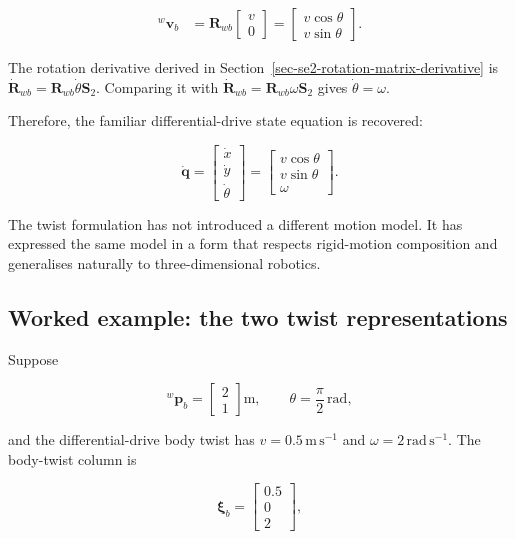 \documentclass[
  australian,
  12pt,
  letterpaper,
  DIV=11,
  numbers=noendperiod,
  twoside]{scrreprt}
\begin{document}
\[
\begin{aligned}
{}^w\mathbf v_b
&=
\mathbf R_{wb}
\begin{bmatrix}
v\\0
\end{bmatrix}
=
\begin{bmatrix}
v\cos\theta\\
v\sin\theta
\end{bmatrix}.
\end{aligned}
\]

The rotation derivative derived in
Section~\ref{sec-se2-rotation-matrix-derivative} is
\(\dot{\mathbf R}_{wb}=\mathbf R_{wb}\dot\theta\mathbf S_2\). Comparing
it with \(\dot{\mathbf R}_{wb}=\mathbf R_{wb}\omega\mathbf S_2\) gives
\(\dot\theta=\omega\).

Therefore, the familiar differential-drive state equation is recovered:

\[
\boxed{
\dot{\mathbf q}
=
\begin{bmatrix}
\dot x\\
\dot y\\
\dot\theta
\end{bmatrix}
=
\begin{bmatrix}
v\cos\theta\\
v\sin\theta\\
\omega
\end{bmatrix}
}.
\]

The twist formulation has not introduced a different motion model. It
has expressed the same model in a form that respects rigid-motion
composition and generalises naturally to three-dimensional robotics.

\subsection{Worked example: the two twist
representations}\label{worked-example-the-two-twist-representations}

Suppose

\[
{}^w\mathbf p_b
=
\begin{bmatrix}
2\\1
\end{bmatrix}
\mathrm m,
\qquad
\theta
=
\frac{\pi}{2}\,\mathrm{rad},
\]

and the differential-drive body twist has \(v=0.5\,\mathrm{m\,s^{-1}}\)
and \(\omega=2\,\mathrm{rad\,s^{-1}}\). The body-twist column is

\[
\boldsymbol\xi_b
=
\begin{bmatrix}
0.5\\0\\2
\end{bmatrix},
\]
\end{document}
